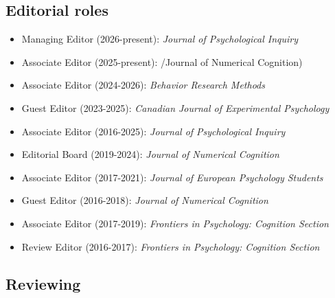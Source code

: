 \documentclass[article,10pt]{article}
\begin{document}
\subsection*{Editorial roles}
\label{sec:org4daae99}
\begin{itemize}
\item Managing Editor (2026-present): \emph{Journal of Psychological Inquiry}
\item Associate Editor (2025-present): /Journal of Numerical Cognition)
\item Associate Editor (2024-2026): \emph{Behavior Research Methods}
\item Guest Editor (2023-2025): \emph{Canadian Journal of Experimental Psychology}
\item Associate Editor (2016-2025): \emph{Journal of Psychological Inquiry}
\item Editorial Board (2019-2024): \emph{Journal of Numerical Cognition}
\item Associate Editor (2017-2021): \emph{Journal of European Psychology Students}
\item Guest Editor (2016-2018): \emph{Journal of Numerical Cognition}
\item Associate Editor (2017-2019): \emph{Frontiers in Psychology: Cognition Section}
\item Review Editor (2016-2017): \emph{Frontiers in Psychology: Cognition Section}
\end{itemize}
\subsection*{Reviewing}
\label{sec:org57ff80c}
\end{document}
